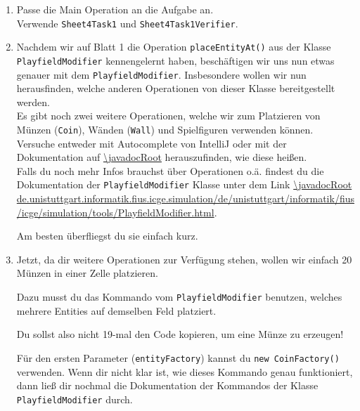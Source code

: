 
\label{ex4}

\begin{enumerate}
    \item 
    Passe die Main Operation an die Aufgabe an.\\
		Verwende \lstinline{Sheet4Task1} und \lstinline{Sheet4Task1Verifier}.
\end{enumerate}



\begin{enumerate} \setcounter{enumi}{1}
    

    \item Nachdem wir auf Blatt 1 die Operation \lstinline{placeEntityAt()} aus der Klasse \lstinline{PlayfieldModifier} kennengelernt haben, beschäftigen wir uns nun etwas genauer mit dem \lstinline{PlayfieldModifier}.
        Insbesondere wollen wir nun herausfinden, welche anderen Operationen von dieser Klasse bereitgestellt werden. \\
        Es gibt noch zwei weitere Operationen, welche wir zum Platzieren von Münzen (\lstinline{Coin}), Wänden (\lstinline{Wall}) und Spielfiguren verwenden können.\\

        Versuche entweder mit Autocomplete von IntelliJ oder mit der Dokumentation auf \url{\javadocRoot} herauszufinden, wie diese heißen.\\

        Falls du noch mehr Infos brauchst über Operationen o.ä. findest du die Dokumentation der \newline \lstinline{PlayfieldModifier} Klasse unter dem Link \url{\javadocRoot de.unistuttgart.informatik.fius.icge.simulation/de/unistuttgart/informatik/fius/icge/simulation/tools/PlayfieldModifier.html}.

        Am besten überfliegst du sie einfach kurz.

\end{enumerate}



\begin{enumerate} \setcounter{enumi}{2}
    \item Jetzt, da dir weitere Operationen zur Verfügung stehen, wollen wir einfach 20 Münzen in einer Zelle platzieren.

    Dazu musst du das Kommando vom \lstinline{PlayfieldModifier} benutzen, welches mehrere Entities auf demselben Feld platziert.
    
    Du sollst also nicht 19-mal den Code kopieren, um eine Münze zu erzeugen!
    
    Für den ersten Parameter (\lstinline{entityFactory}) kannst du \lstinline{new CoinFactory()} verwenden.
    Wenn dir nicht klar ist, wie dieses Kommando genau funktioniert, dann ließ dir nochmal die Dokumentation der Kommandos der Klasse \lstinline{PlayfieldModifier} durch.
\end{enumerate}




